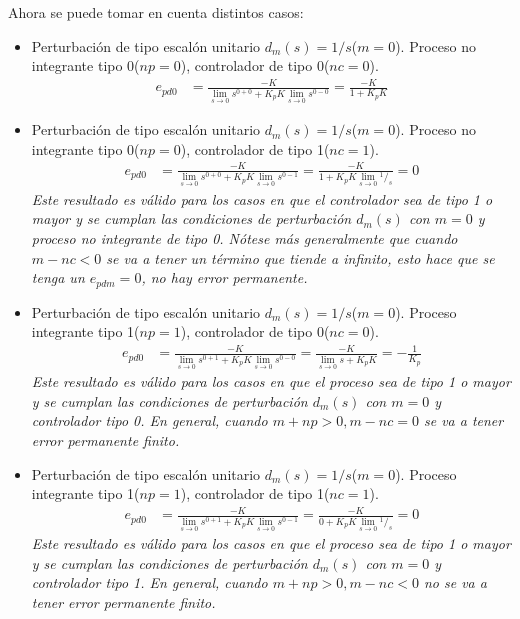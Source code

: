 \begin{ejercicio}
  Ahora se puede tomar en cuenta distintos casos:
  \begin{itemize}
    \item Perturbación de tipo escalón unitario $d_m(s)=1/s$($m=0$). Proceso no integrante tipo 0($np=0$), controlador de tipo 0($nc=0$).
    \begin{align*}
      e_{pd0} &= \frac{-K}
      {\lim_{s\rightarrow 0}s^{0+0} + K_p K\lim_{s\rightarrow 0} s^{0-0}}
      = \frac{-K}{1 + K_p K}
    \end{align*}

    \item Perturbación de tipo escalón unitario $d_m(s)=1/s$($m=0$). Proceso no integrante tipo 0($np=0$), controlador de tipo 1($nc=1$).
    \begin{align*}
      e_{pd0} &= \frac{-K}
      {\lim_{s\rightarrow 0}s^{0+0} + K_p K\lim_{s\rightarrow 0} s^{0-1}}
      =
      \frac{-K}
      {1 + K_p K\lim_{s\rightarrow 0} {^1/_s}}
      =
      0
    \end{align*}
    \textit{Este resultado es válido para los casos en que el controlador sea de tipo 1 o mayor y se cumplan las condiciones de perturbación $d_m(s)$ con $m=0$ y proceso no integrante de tipo 0. Nótese más generalmente que cuando $m-nc<0$ se va a tener un término que tiende a infinito, esto hace que se tenga un $e_{pdm} = 0$, no hay error permanente.}

    \item
    Perturbación de tipo escalón unitario $d_m(s)=1/s$($m=0$). Proceso integrante tipo 1($np=1$), controlador de tipo 0($nc=0$).
    \begin{align*}
      e_{pd0} &= \frac{-K}
      {\lim_{s\rightarrow 0}s^{0+1} + K_p K\lim_{s\rightarrow 0} s^{0-0}}
      =
      \frac{-K}
      {\lim_{s\rightarrow 0}s + K_p K}
      =
      -\frac{1}{K_p}
    \end{align*}
    \textit{Este resultado es válido para los casos en que el proceso sea de tipo 1 o mayor y se cumplan las condiciones de perturbación $d_m(s)$ con $m=0$ y controlador tipo 0. En general, cuando $m+np>0, m-nc=0$ se va a tener error permanente finito.}

    \item
    Perturbación de tipo escalón unitario $d_m(s)=1/s$($m=0$). Proceso integrante tipo 1($np=1$), controlador de tipo 1($nc=1$).
    \begin{align*}
      e_{pd0} &= \frac{-K}
      {\lim_{s\rightarrow 0}s^{0+1} + K_p K\lim_{s\rightarrow 0} s^{0-1}}
      =
      \frac{-K}
      {0 + K_p K\lim_{s\rightarrow 0} {^1/_s}}
      =
      0
    \end{align*}
    \textit{Este resultado es válido para los casos en que el proceso sea de tipo 1 o mayor y se cumplan las condiciones de perturbación $d_m(s)$ con $m=0$ y controlador tipo 1. En general, cuando $m+np>0, m-nc<0$ no se va a tener error permanente finito.}


\end{itemize}
\end{ejercicio}
